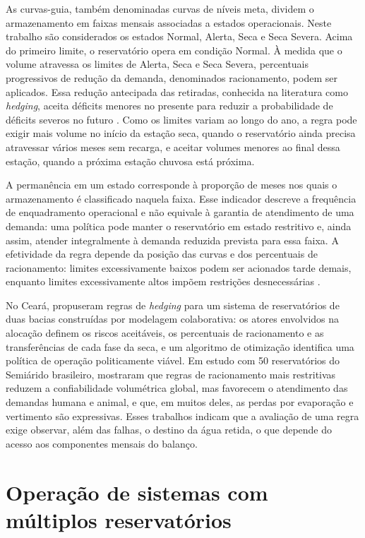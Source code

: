 As curvas-guia, também denominadas curvas de níveis meta, dividem o armazenamento em faixas mensais associadas a estados operacionais. Neste trabalho são considerados os estados Normal, Alerta, Seca e Seca Severa. Acima do primeiro limite, o reservatório opera em condição Normal. À medida que o volume atravessa os limites de Alerta, Seca e Seca Severa, percentuais progressivos de redução da demanda, denominados racionamento, podem ser aplicados. Essa redução antecipada das retiradas, conhecida na literatura como \textit{hedging}, aceita déficits menores no presente para reduzir a probabilidade de déficits severos no futuro \cite{shihReVelle1994}. Como os limites variam ao longo do ano, a regra pode exigir mais volume no início da estação seca, quando o reservatório ainda precisa atravessar vários meses sem recarga, e aceitar volumes menores ao final dessa estação, quando a próxima estação chuvosa está próxima.

A permanência em um estado corresponde à proporção de meses nos quais o armazenamento é classificado naquela faixa. Esse indicador descreve a frequência de enquadramento operacional e não equivale à garantia de atendimento de uma demanda: uma política pode manter o reservatório em estado restritivo e, ainda assim, atender integralmente à demanda reduzida prevista para essa faixa. A efetividade da regra depende da posição das curvas e dos percentuais de racionamento: limites excessivamente baixos podem ser acionados tarde demais, enquanto limites excessivamente altos impõem restrições desnecessárias \cite{shihReVelle1994}.

No Ceará,  propuseram regras de \textit{hedging} para um sistema de reservatórios de duas bacias construídas por modelagem colaborativa: os atores envolvidos na alocação definem os riscos aceitáveis, os percentuais de racionamento e as transferências de cada fase da seca, e um algoritmo de otimização identifica uma política de operação politicamente viável. Em estudo com 50 reservatórios do Semiárido brasileiro,  mostraram que regras de racionamento mais restritivas reduzem a confiabilidade volumétrica global, mas favorecem o atendimento das demandas humana e animal, e que, em muitos deles, as perdas por evaporação e vertimento são expressivas. Esses trabalhos indicam que a avaliação de uma regra exige observar, além das falhas, o destino da água retida, o que depende do acesso aos componentes mensais do balanço.

\section{Operação de sistemas com múltiplos reservatórios}
\label{sec:multiplos-reservatorios}


